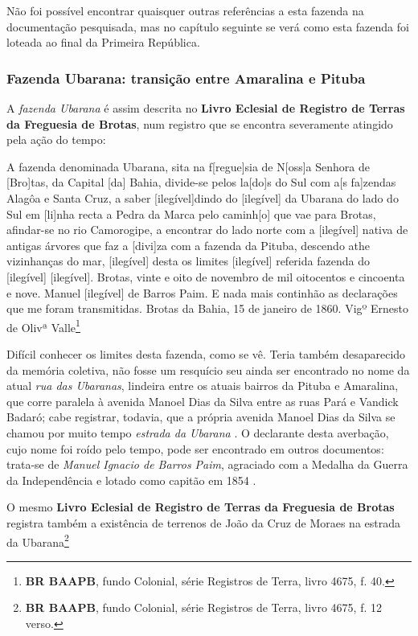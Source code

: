 Não foi possível encontrar quaisquer outras referências a esta fazenda na documentação pesquisada, mas no capítulo seguinte se verá como esta fazenda foi loteada ao final da Primeira República.

\subsubsection{Fazenda Ubarana: transição entre Amaralina e Pituba}

A \textit{fazenda Ubarana} é assim descrita no \textbf{Livro Eclesial de Registro de Terras da Freguesia de Brotas}, num registro que se encontra severamente atingido pela ação do tempo:

\begin{citacao}
A fazenda denominada Ubarana, sita na f[regue]sia de N[oss]a Senhora de [Bro]tas, da Capital [da] Bahia, divide-se pelos la[do]s do Sul com a[s fa]zendas Alagôa e Santa Cruz, a saber [ilegível]dindo do [ilegível] da Ubarana do lado do Sul em [li]nha recta a Pedra da Marca pelo caminh[o] que vae para Brotas, afindar-se no rio Camorogipe, a encontrar do lado norte com a [ilegível] nativa de antigas árvores que faz a [divi]za com a fazenda da Pituba, descendo athe vizinhanças do mar, [ilegível] desta os limites [ilegível] referida fazenda do [ilegível] [ilegível]. Brotas, vinte e oito de novembro de mil oitocentos e cincoenta e nove. Manuel [ilegível] de Barros Paim. E nada mais continhão as declarações que me foram transmitidas. Brotas da Bahia, 15 de janeiro de 1860. Vigº Ernesto de Olivª Valle\footnote{\textbf{BR BAAPB}, fundo Colonial, série Registros de Terra, livro 4675, f. 40.}
\end{citacao}

Difícil conhecer os limites desta fazenda, como se vê. Teria também desaparecido da memória coletiva, não fosse um resquício seu ainda ser encontrado no nome da atual \textit{rua das Ubaranas}, lindeira entre os atuais bairros da Pituba e Amaralina, que corre paralela à avenida Manoel Dias da Silva entre as ruas Pará e Vandick Badaró; cabe registrar, todavia, que a própria avenida Manoel Dias da Silva se chamou por muito tempo \textit{estrada da Ubarana} \cite[]{}. O declarante desta averbação, cujo nome foi roído pelo tempo, pode ser encontrado em outros documentos: trata-se de \textit{Manuel Ignacio de Barros Paim}, agraciado com a Medalha da Guerra da Independência e lotado como capitão em 1854 \cite[p.~172]{masson_almanak_1854}. 

O mesmo \textbf{Livro Eclesial de Registro de Terras da Freguesia de Brotas} registra também a existência de terrenos de João da Cruz de Moraes na estrada da Ubarana\footnote{\textbf{BR BAAPB}, fundo Colonial, série Registros de Terra, livro 4675, f. 12 verso.}

